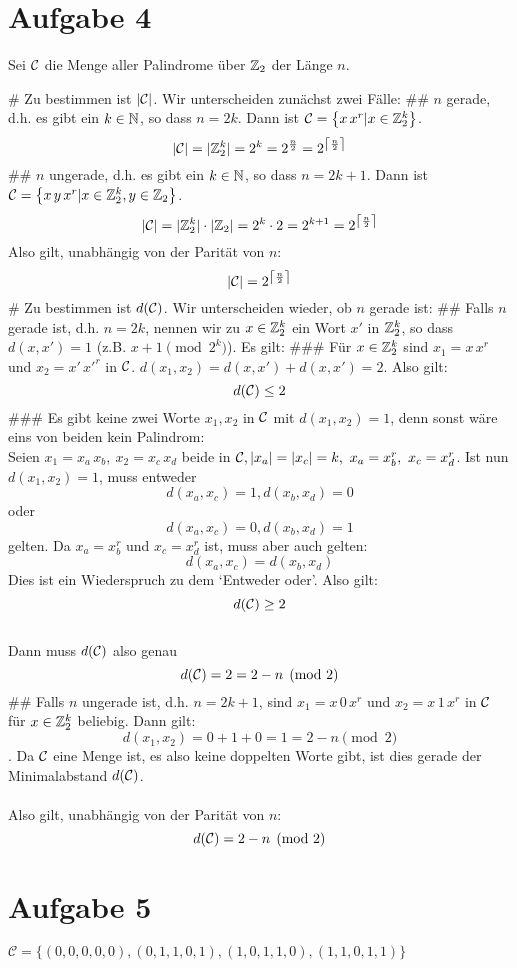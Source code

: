 \section*{Aufgabe 4}
Sei $\mathcal{C}$ die Menge aller Palindrome über $\mathbb{Z}_2$ der Länge $n$. \\
\begin{myList}
# Zu bestimmen ist $|\mathcal{C}|$. Wir unterscheiden zunächst zwei Fälle:
## $n$ gerade, d.h. es gibt ein $k\in\mathbb{N}$, so dass $n=2k$. Dann ist $\mathcal{C}=\left\lbrace x\,x^r|x\in\mathbb{Z}^k_2 \right\rbrace$.
$$|\mathcal{C}| = |\mathbb{Z}^k_2|=2^k=2^{\frac n 2}=2^{\left\lceil\frac n 2\right\rceil}$$
## $n$ ungerade, d.h. es gibt ein $k\in\mathbb{N}$, so dass $n=2k+1$. Dann ist $\mathcal{C}=\left\lbrace x\,y\,x^r|x\in\mathbb{Z}^k_2, y\in\mathbb{Z}_2 \right\rbrace$.
$$|\mathcal{C}| = |\mathbb{Z}^k_2|\cdot|\mathbb{Z}_2|=2^k\cdot 2=2^{k+1}=2^{\left\lceil\frac n 2\right\rceil}$$
Also gilt, unabhängig von der Parität von $n$:
$$|\mathcal{C}|=2^{\left\lceil\frac n 2\right\rceil}$$
# Zu bestimmen ist $d(\mathcal{C})$. Wir unterscheiden wieder, ob $n$ gerade ist:
## Falls $n$ gerade ist, d.h. $n=2k$, nennen wir zu $x\in\mathbb{Z}_2^k$ ein Wort $x'$ in $\mathbb{Z}_2^k$, so dass $d(x, x')=1$ (z.B. $x + 1\pmod {2^k}$). Es gilt:
### Für $x\in\mathbb{Z}_2^k$ sind $x_1=x\,x^r$ und $x_2=x'\,x'^r$ in $\mathcal{C}$. $d(x_1, x_2)=d(x, x')+d(x, x')=2$. Also gilt:
$$d(\mathcal{C})\leq 2$$
### Es gibt keine zwei Worte $x_1, x_2$ in $\mathcal{C}$ mit $d(x_1, x_2)=1$, denn sonst wäre eins von beiden kein Palindrom: \\
Seien $x_1=x_a\,x_b,~x_2=x_c\, x_d$ beide in $\mathcal{C}, |x_a|=|x_c|=k,~x_a=x_b^r,~x_c=x_d^r$. Ist nun $d(x_1, x_2)=1$, muss entweder $$d(x_a, x_c)=1, d(x_b, x_d)=0$$ oder $$d(x_a, x_c)=0, d(x_b, x_d)=1$$ gelten.
Da $x_a=x_b^r$ und $x_c=x_d^r$ ist, muss aber auch gelten:
$$d(x_a, x_c)=d(x_b, x_d)$$
Dies ist ein Wiederspruch zu dem `Entweder oder'. Also gilt:
$$d(\mathcal{C})\geq 2$$
\\Dann muss $d(\mathcal{C})$ also genau
$$d(\mathcal{C})=2=2-n\pmod 2$$
## Falls $n$ ungerade ist, d.h. $n=2k+1$, sind $x_1=x\,0\,x^r$ und $x_2=x\,1\,x^r$ in $\mathcal{C}$ für $x\in\mathbb{Z}_2^k$ beliebig. Dann gilt: $$d(x_1, x_2)=0+1+0=1=2-n\pmod 2$$. Da $\mathcal{C}$ eine Menge ist, es also keine doppelten Worte gibt, ist dies gerade der Minimalabstand $d(\mathcal{C})$.\\\\
Also gilt, unabhängig von der Parität von $n$:
$$d(\mathcal{C})=2-n\pmod 2$$
\end{myList}

\section*{Aufgabe 5}
$\mathcal{C} = \lbrace (0,0,0,0,0) , (0,1,1,0,1) , (1,0,1,1,0) , (1,1,0,1,1) \rbrace$

